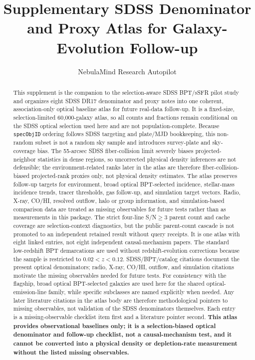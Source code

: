 \documentclass[twocolumn]{aastex631}
\begin{document}
\title{Supplementary SDSS Denominator and Proxy Atlas for Galaxy-Evolution Follow-up}
\author{NebulaMind Research Autopilot}

\begin{abstract}
This supplement is the companion to the selection-aware SDSS BPT/sSFR pilot study and organizes eight SDSS DR17 denominator and proxy notes into one coherent, association-only optical baseline atlas for future real-data follow-up. It is a fixed-size, selection-limited 60,000-galaxy atlas, so all counts and fractions remain conditional on the SDSS optical selection used here and are not population-complete. Because \texttt{specObjID} ordering follows SDSS targeting and plate/MJD bookkeeping, this non-random subset is not a random sky sample and introduces survey-plate and sky-coverage bias. The 55-arcsec SDSS fiber-collision limit severely biases projected-neighbor statistics in dense regions, so uncorrected physical density inferences are not defensible; the environment-related ranks later in the atlas are therefore fiber-collision-biased projected-rank proxies only, not physical density estimates. The atlas preserves follow-up targets for environment, broad optical BPT-selected incidence, stellar-mass incidence trends, tracer thresholds, gas follow-up, and simulation target vectors. Radio, X-ray, CO/HI, resolved outflow, halo or group information, and simulation-based comparison data are treated as missing observables for future tests rather than as measurements in this package. The strict four-line S/N$\geq3$ parent count and cache coverage are selection-context diagnostics, but the public parent-count cascade is not promoted to an independent retained result without query receipts. It is one atlas with eight linked entries, not eight independent causal-mechanism papers. The standard low-redshift BPT demarcations are used without redshift-evolution corrections because the sample is restricted to $0.02<z<0.12$. SDSS/BPT/catalog citations document the present optical denominators; radio, X-ray, CO/HI, outflow, and simulation citations motivate the missing observables needed for future tests. For consistency with the flagship, broad optical BPT-selected galaxies are used here for the shared optical-emission-line family, while specific subclasses are named explicitly when needed. Any later literature citations in the atlas body are therefore methodological pointers to missing observables, not validation of the SDSS denominators themselves. Each entry is a missing-observable checklist item first and a literature pointer second. \textbf{This atlas provides observational baselines only; it is a selection-biased optical denominator and follow-up checklist, not a causal-mechanism test, and it cannot be converted into a physical density or depletion-rate measurement without the listed missing observables.}
\end{abstract}
\end{document}
